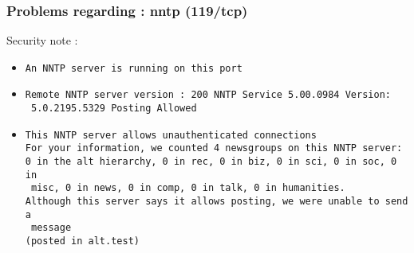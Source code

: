 \documentclass{article}
\begin{document}
\subsubsection{Problems regarding : nntp (119/tcp)}
Security note :\\
\begin{itemize}
\item \begin{verbatim}
An NNTP server is running on this port
\end{verbatim}\item \begin{verbatim}
Remote NNTP server version : 200 NNTP Service 5.00.0984 Version:
 5.0.2195.5329 Posting Allowed 

\end{verbatim}\item \begin{verbatim}
This NNTP server allows unauthenticated connections
For your information, we counted 4 newsgroups on this NNTP server:
0 in the alt hierarchy, 0 in rec, 0 in biz, 0 in sci, 0 in soc, 0 in
 misc, 0 in news, 0 in comp, 0 in talk, 0 in humanities.
Although this server says it allows posting, we were unable to send a
 message
(posted in alt.test)


\end{verbatim}\end{itemize}
\end{document}
